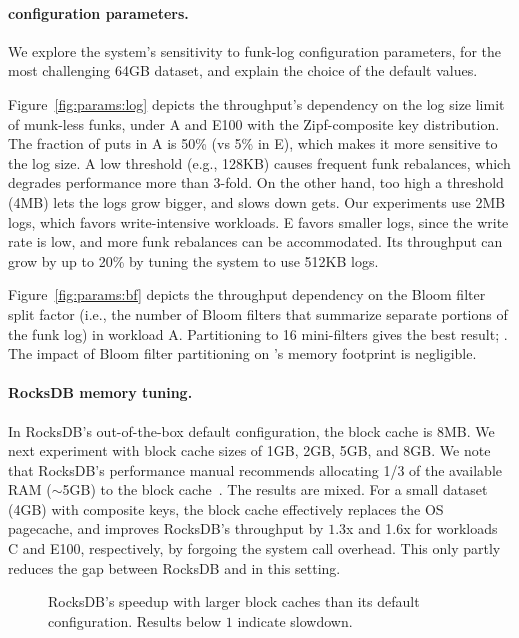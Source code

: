 {\paragraph{\sys\/ configuration parameters.} 
We explore the system's  sensitivity to funk-log configuration parameters, for the most challenging 64GB dataset, 
and explain the choice of the default values.

Figure~\ref{fig:params:log} depicts the throughput's dependency on the log size limit of munk-less funks, 
under  A and E100  with the Zipf-composite key distribution. 
The fraction of puts in A is 50\% (vs 5\% in E), which makes it more sensitive to the log size. 
A low threshold (e.g., 128KB) causes frequent funk rebalances, which degrades performance more than 3-fold. 
On the other hand, too high a threshold (4MB) lets the logs grow bigger, and slows down gets. Our experiments  
use 2MB logs, which favors write-intensive workloads. E favors smaller logs, since the write 
rate is low, and more funk rebalances can be accommodated. Its throughput can  grow by up to 20\% 
by tuning the system to use 512KB logs.

Figure~\ref{fig:params:bf} depicts the throughput dependency on the Bloom filter split factor (i.e., the 
number of Bloom filters that summarize separate portions of the funk log) in workload A. 
Partitioning to 16 mini-filters gives the best result; . 
The impact of Bloom filter partitioning on \sys's %
memory footprint is negligible.

\paragraph{RocksDB memory tuning.} In RocksDB's out-of-the-box default configuration, the block cache is 8MB. 
We next experiment with block cache sizes of 1GB, 2GB, 5GB, and 8GB. We note that 
RocksDB's performance manual recommends allocating 1/3 of the available RAM 
($\sim$5GB) to the block cache~\cite{RocksDBMemoryTuning}.
The results are mixed. For a small 
dataset (4GB) with composite keys, the block cache effectively replaces 
the OS pagecache, and improves RocksDB's throughput by $1.3$x and 1.6x
for workloads C and E100, respectively, by forgoing the system call overhead. This only partly reduces the gap between
RocksDB and \sys\/ in this setting. 

\begin{figure}[htb]
\caption{RocksDB's speedup with larger block caches than its default configuration. Results below $1$ indicate slowdown.}
\label{fig:rocks-memory}
\end{figure}

}
